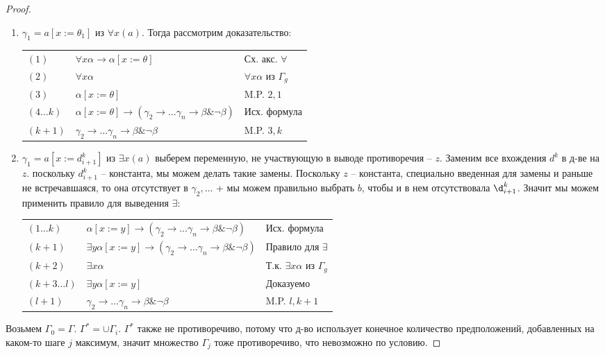 \begin{proof}
\begin{enumerate}
\item $\gamma_1 = a[x:=\theta_1]$ из $\forall x (a)$. Тогда рассмотрим доказательство:\\
\begin{tabular}{lll}
$(1)$ & $\forall x \alpha \rightarrow \alpha [x := \theta]$ & Сх. акс. $\forall$\\
$(2)$ & $\forall x \alpha$ & $\forall x \alpha$ из $\Gamma_g$\\
$(3)$ & $\alpha [x := \theta]$ & M.P. $2,1$\\
$(4 \dots k)$ & $\alpha [x := \theta] \rightarrow (\gamma_2 \rightarrow \dots \gamma_n \rightarrow \beta \& \neg \beta)$ & Исх. формула\\
$(k+1)$ & $\gamma_2 \rightarrow \dots \gamma_n \rightarrow \beta \& \neg \beta$ & M.P. $3,k$
\end{tabular}
\item $\gamma_1 = a[x:=d_{i+1}^k]$ из $\exists x(a)$ выберем переменную, не участвующую в выводе противоречия -- $z$. Заменим все вхождения $d^k$ в д-ве на $z$. поскольку $d_{i+1}^k$ -- константа, мы можем делать такие замены. Поскольку $z$ -- константа, специально введенная для замены и раньше не встречавшаяся, то она отсутствует в $\gamma_2,\dots$ + мы можем правильно выбрать $b$, чтобы и в нем отсутствовала $\d_{i+1}^k$. Значит мы можем применить правило для выведения $\exists$:\\
\begin{tabular}{lll}
$(1 \dots k)$ & $\alpha [x := y] \rightarrow (\gamma_2 \rightarrow \dots \gamma_n \rightarrow \beta \& \neg \beta)$ & Исх. формула\\
$(k+1)$ & $\exists y \alpha [x := y] \rightarrow (\gamma_2 \rightarrow \dots \gamma_n \rightarrow \beta \& \neg \beta)$ & Правило для $\exists$\\
$(k+2)$ & $\exists x \alpha$ & Т.к. $\exists x \alpha$ из $\Gamma_g$ \\
$(k+3 \dots l)$ & $\exists y \alpha [x := y]$ & Доказуемо \\
$(l+1)$ & $\gamma_2 \rightarrow \dots \gamma_n \rightarrow \beta \& \neg \beta$ & M.P. $l, k+1$
\end{tabular}
\end{enumerate}
Возьмем $\Gamma_0 = \Gamma$. $\Gamma^* = \cup \Gamma_i$. $\Gamma^*$ также не противоречиво, потому что д-во использует конечное количество предположений, добавленных на каком-то шаге $j$ максимум, значит множество $Γ_j$ тоже противоречиво, что невозможно по условию.
\end{proof}
